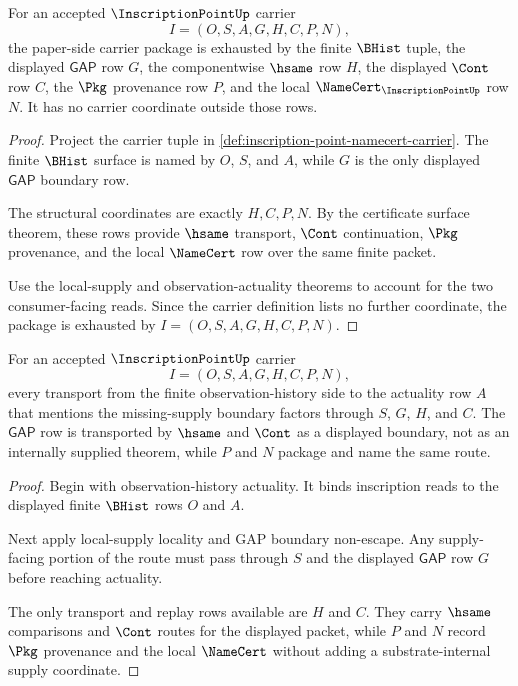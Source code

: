 \begin{theorem}
\label{thm:inscription-point-lean-carrier-package}
For an accepted $\InscriptionPointUp$ carrier
$$
I=(O,S,A,G,H,C,P,N),
$$
the paper-side carrier package is exhausted by the finite $\BHist$ tuple, the displayed $\mathsf{GAP}$ row $G$, the componentwise $\hsame$ row $H$, the displayed $\Cont$ row $C$, the $\Pkg$ provenance row $P$, and the local $\NameCert_{\InscriptionPointUp}$ row $N$. It has no carrier coordinate outside those rows.
\end{theorem}
\begin{proof}
Project the carrier tuple in \autoref{def:inscription-point-namecert-carrier}. The finite $\BHist$ surface is named by $O$, $S$, and $A$, while $G$ is the only displayed $\mathsf{GAP}$ boundary row.

The structural coordinates are exactly $H,C,P,N$. By the certificate surface theorem, these rows provide $\hsame$ transport, $\Cont$ continuation, $\Pkg$ provenance, and the local $\NameCert$ row over the same finite packet.

Use the local-supply and observation-actuality theorems to account for the two consumer-facing reads. Since the carrier definition lists no further coordinate, the package is exhausted by $I=(O,S,A,G,H,C,P,N)$.
\end{proof}

\begin{theorem}
\label{thm:inscription-point-gap-actuality-transport}
For an accepted $\InscriptionPointUp$ carrier
$$
I=(O,S,A,G,H,C,P,N),
$$
every transport from the finite observation-history side to the actuality row $A$ that mentions the missing-supply boundary factors through $S$, $G$, $H$, and $C$. The $\mathsf{GAP}$ row is transported by $\hsame$ and $\Cont$ as a displayed boundary, not as an internally supplied theorem, while $P$ and $N$ package and name the same route.
\end{theorem}
\begin{proof}
Begin with observation-history actuality. It binds inscription reads to the displayed finite $\BHist$ rows $O$ and $A$.

Next apply local-supply locality and GAP boundary non-escape. Any supply-facing portion of the route must pass through $S$ and the displayed $\mathsf{GAP}$ row $G$ before reaching actuality.

The only transport and replay rows available are $H$ and $C$. They carry $\hsame$ comparisons and $\Cont$ routes for the displayed packet, while $P$ and $N$ record $\Pkg$ provenance and the local $\NameCert$ without adding a substrate-internal supply coordinate.
\end{proof}

